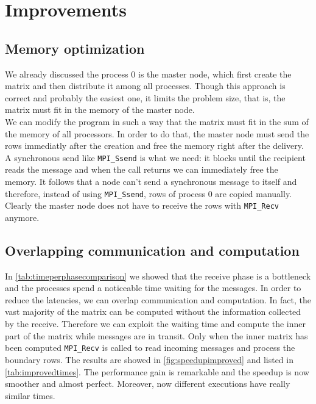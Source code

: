 \documentclass{article}
\begin{document}
\section{Improvements}

\subsection{Memory optimization}
We already discussed the process 0 is the master node, which first create the matrix and then distribute it among all processes. Though this approach is correct and probably the easiest one, it limits the problem size, that is, the matrix must fit in the memory of the master node. \\
We can modify the program in such a way that the matrix must fit in the sum of the memory of all processors. In order to do that, the master node must send the rows immediatly after the creation and free the memory right after the delivery. A synchronous send like \texttt{MPI\_Ssend} is what we need: it blocks until the recipient reads the message and when the call returns we can immediately free the memory. It follows that a node can't send a synchronous message to itself and therefore, instead of using \texttt{MPI\_Ssend}, rows of process 0 are copied manually. Clearly the master node does not have to receive the rows with \texttt{MPI\_Recv} anymore.


\subsection{Overlapping communication and computation} \label{sec:overlappingcommcomp}
In \autoref{tab:timeperphasecomparison} we showed that the receive phase is a bottleneck and the processes spend a noticeable time waiting for the messages. In order to reduce the latencies, we can overlap communication and computation. In fact, the vast majority of the matrix can be computed without the information collected by the receive. Therefore we can exploit the waiting time and compute the inner part of the matrix while messages are in transit. Only when the inner matrix has been computed \texttt{MPI\_Recv} is called to read incoming messages and process the boundary rows. The results are showed in \autoref{fig:speedupimproved} and listed in \autoref{tab:improvedtimes}. The performance gain is remarkable and the speedup is now smoother and almost perfect. Moreover, now different executions have really similar times.
\end{document}
